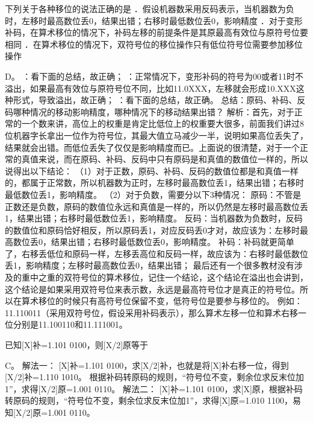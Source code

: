 \question 下列关于各种移位的说法正确的是
．假设机器数采用反码表示，当机器数为负时，左移时最高数位丢0，结果出错；右移时最低数位丢0，影响精度
．对于变形补码，在算术移位的情况下，补码左移的前提条件是其原最高有效位与原符号位要相同
．在算术移位的情况下，双符号位的移位操作只有低位符号位需要参加移位操作
\par{}
\begin{solution}D。 ：看下面的总结，故正确；
：正常情况下，变形补码的符号为00或者11时不溢出，如果最高有效位与原符号位不同，比如11.0XXX，左移就会形成10.XXX这种形式，导致溢出，故正确；
：看下面的总结，故正确。
总结：原码、补码、反码哪种情况的移动影响精度，哪种情况下的移动结果出错？
解析：首先，对于正常的一个数来讲，高位上的权重是肯定比低位上的权重要大很多，前面我们讲过8位机器字长拿出一位作为符号位，其最大值立马减少一半，说明如果高位丢失了，结果就会出错。而低位丢失了仅仅是影响精度而已。上面说的很清楚，对于一个正常的真值来说，而在原码、补码、反码中只有原码是和真值的数值位一样的，所以说得出以下结论：
（1）对于正数，原码、补码、反码的数值位都是和真值一样的，都属于正常数，所以机器数为正时，左移时最高数位丢1，结果出错；右移时最低数位丢1，影响精度。
（2）对于负数，需要分以下3种情况：
原码：不管是正数还是负数，原码的数值位永远和真值是一样的，所以仍然是左移时最高数位丢1，结果出错；右移时最低数位丢1，影响精度。
反码：当机器数为负数时，反码的数值位和原码恰好相反，所以原码丢1，对应反码丢0才对，故应该为：左移时最高数位丢0，结果出错；右移时最低数位丢0，影响精度。
补码：补码就更简单了，右移丢低位和原码一样，左移丢高位和反码一样，故应该为：右移时最低数位丢1，影响精度；左移时最高数位丢0，结果出错；
最后还有一个很多教材没有涉及的重中之重的双符号位的算术移位，记住一个结论，这个结论在溢出也会讲到，这个结论是如果采用双符号位来表示数，永远是最高符号位才是真正的符号位。所以在算术移位的时候只有高符号位保留不变，低符号位是要参与移位的。
例如：11.110011（采用双符号位，假设采用补码表示），那么算术左移一位和算术右移一位分别是11.100110和11.111001。
\end{solution}
\question 已知{[}X{]}补=1.101 0100，则{[}X/2{]}原等于
\par{}
\begin{solution}C。 解法一： {[}X{]}补=1.101
0100，求{[}X/2{]}补，也就是将{[}X{]}补右移一位，得到{[}X/2{]}补=1.110
1010。
根据补码转原码的规则，``符号位不变，剩余位求反末位加1''，求得{[}X/2{]}原=1.001
0110。 解法二： {[}X{]}补=1.101
0100，求{[}X{]}原，根据补码转原码的规则，``符号位不变，剩余位求反末位加1''，求得{[}X{]}原=1.010
1100，易知{[}X/2{]}原=1.001 0110。
\end{solution}
